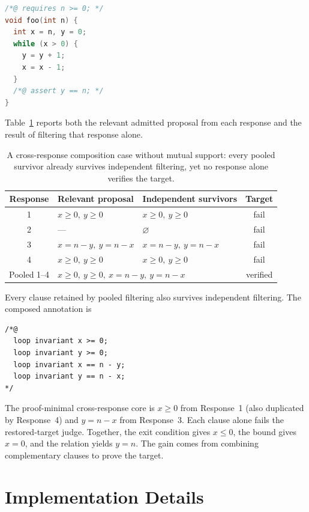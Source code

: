 \begin{lstlisting}[language=C,numbers=none]
/*@ requires n >= 0; */
void foo(int n) {
  int x = n, y = 0;
  while (x > 0) {
    y = y + 1;
    x = x - 1;
  }
  /*@ assert y == n; */
}
\end{lstlisting}

Table~\ref{tab:no-support-composition-case} reports both the relevant admitted
proposal from each response and the result of filtering that response alone.

\begin{table}[H]
\centering
\small
\begin{tabular}{cllc}
\toprule
\rowcolor{algobg}
Response & Relevant proposal & Independent survivors & Target \\
\midrule
1 & \(x\geq0,\ y\geq0\) & \(x\geq0,\ y\geq0\) & fail \\
2 & --- & \(\varnothing\) & fail \\
3 & \(x=n-y,\ y=n-x\) & \(x=n-y,\ y=n-x\) & fail \\
4 & \(x\geq0,\ y\geq0\) & \(x\geq0,\ y\geq0\) & fail \\
\midrule
Pooled 1--4 & \multicolumn{2}{l}{\(x\geq0,\ y\geq0,\ x=n-y,\ y=n-x\)} & verified \\
\bottomrule
\end{tabular}
\caption{A cross-response composition case without mutual support: every
pooled survivor already survives independent filtering, yet no response alone
verifies the target.}
\label{tab:no-support-composition-case}
\end{table}

\noindent\begin{minipage}{\textwidth}
Every clause retained by pooled filtering also survives independent filtering.
The composed annotation is
\begin{lstlisting}
/*@
  loop invariant x >= 0;
  loop invariant y >= 0;
  loop invariant x == n - y;
  loop invariant y == n - x;
*/
\end{lstlisting}
The proof-minimal cross-response core is \(x\geq0\) from Response~1 (also
duplicated by Response~4) and \(y=n-x\) from Response~3.  Each clause alone
fails the restored-target judge.  Together, the exit condition gives
\(x\leq0\), the bound gives \(x=0\), and the relation yields \(y=n\).
The gain comes from combining complementary clauses to prove the target.
\end{minipage}

\section{Implementation Details}
\label{app:constants}

